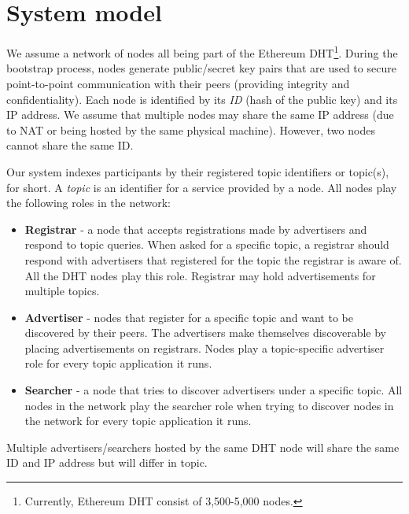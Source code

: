 
\section{System model}
\label{sec:model}

We assume a network of nodes all being part of the Ethereum DHT\footnote{Currently, Ethereum DHT consist of 3,500-5,000 nodes.}. During the bootstrap process, nodes generate public/secret key pairs that are used to secure point-to-point communication with their peers (providing integrity and confidentiality). Each node is identified by its \emph{ID} (hash of the public key) and its IP address. We assume that multiple nodes may share the same IP address (due to NAT or being hosted by the same physical machine). However,  two nodes cannot share the same ID.  

Our system indexes participants by their registered topic identifiers or topic(s), for short. 
A \emph{topic} is an identifier for a service provided by a node. 
All nodes play the following roles in the network:

\begin{itemize}
    \item \textbf{Registrar} - a node that accepts registrations made by advertisers and respond to topic queries. When asked for a specific topic, a registrar should respond with advertisers that registered for the topic the registrar is aware of. 
All the DHT nodes play this role. 
Registrar may hold advertisements for multiple topics. 
    \item \textbf{Advertiser} - nodes that register for a specific topic and want to be discovered by their peers. The advertisers make themselves discoverable by placing advertisements on registrars. Nodes play a topic-specific advertiser role for every topic application it runs.
    \item \textbf{Searcher} - a node that tries to discover advertisers under a specific topic. 
All nodes in the network play the searcher role when trying to discover nodes in the network for every topic application it runs.
\end{itemize}

Multiple advertisers/searchers hosted by the same DHT node will share the same ID and IP address but will differ in topic. 


